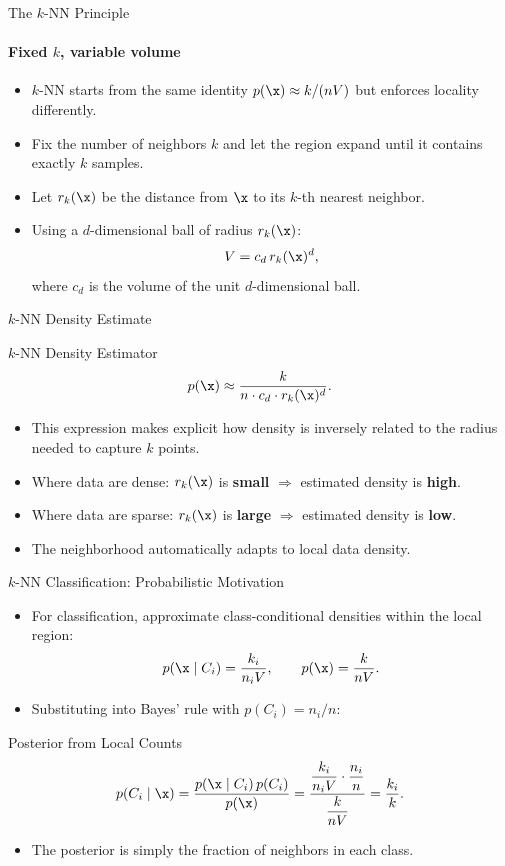 \begin{frame}{The $k$-NN Principle}
  \framesubtitle{Fixed $k$, variable volume}
  \begin{itemize}
    \item $k$-NN starts from the same identity $p(\x) \approx k/(nV)$ but enforces locality differently.
    \item Fix the number of neighbors $k$ and let the region \alert{expand} until it contains exactly $k$ samples.
    \item Let $r_k(\x)$ be the distance from $\x$ to its $k$-th nearest neighbor.
    \item Using a $d$-dimensional ball of radius $r_k(\x)$:
    \[
      V = c_d\,r_k(\x)^d,
    \]
    where $c_d$ is the volume of the unit $d$-dimensional ball.
  \end{itemize}
\end{frame}

\begin{frame}{$k$-NN Density Estimate}
  \begin{block}{$k$-NN Density Estimator}
    \[
      p(\x) \approx \frac{k}{n \cdot c_d \cdot r_k(\x)^d}.
    \]
  \end{block}
  \vspace{0.5em}
  \begin{itemize}
    \item This expression makes explicit how density is \alert{inversely related to the radius} needed to capture $k$ points.
    \item Where data are dense: $r_k(\x)$ is \textbf{small} $\Rightarrow$ estimated density is \textbf{high}.
    \item Where data are sparse: $r_k(\x)$ is \textbf{large} $\Rightarrow$ estimated density is \textbf{low}.
    \item The neighborhood \alert{automatically adapts} to local data density.
  \end{itemize}
\end{frame}

\begin{frame}{$k$-NN Classification: Probabilistic Motivation}
  \begin{itemize}
    \item For classification, approximate class-conditional densities within the local region:
    \[
      p(\x \mid C_i) = \frac{k_i}{n_i V}, \qquad p(\x) = \frac{k}{nV}.
    \]
    \item Substituting into Bayes' rule with $p(C_i) = n_i/n$:
  \end{itemize}
  \begin{block}{Posterior from Local Counts}
    \[
      p(C_i \mid \x)
      = \frac{p(\x \mid C_i)\,p(C_i)}{p(\x)}
      = \frac{\dfrac{k_i}{n_i V} \cdot \dfrac{n_i}{n}}{\dfrac{k}{nV}}
      = \frac{k_i}{k}.
    \]
  \end{block}
  \vspace{0.2em}
  \begin{itemize}
    \item The posterior is simply the \alert{fraction of neighbors in each class}.
  \end{itemize}
\end{frame}

